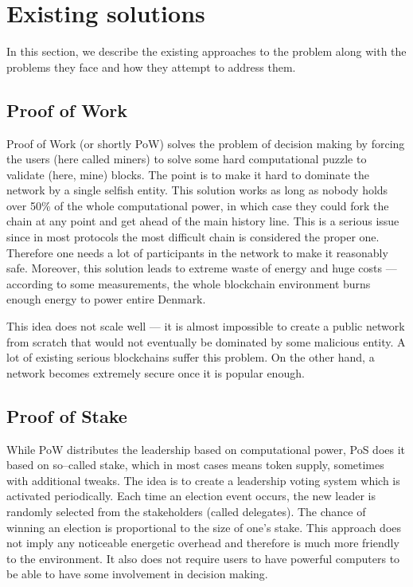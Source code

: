 \section{Existing solutions}

In this section, we describe the existing approaches to the problem along with
the problems they face and how they attempt to address them.

\subsection{Proof of Work}

Proof of Work (or shortly PoW) solves the problem of decision making by forcing
the users (here called miners) to solve some hard computational puzzle to
validate (here, mine) blocks\cite{bitcoin}. The point is to make it hard to
dominate the network by a single selfish entity. This solution works as long as
nobody holds over 50\% of the whole computational power, in which case they
could fork the chain at any point and get ahead of the main history line. This
is a serious issue since in most protocols the most difficult chain is
considered the proper one. Therefore one needs a lot of participants in the
network to make it reasonably safe. Moreover, this solution leads to extreme
waste of energy and huge costs — according to some measurements, the whole
blockchain environment burns enough energy to power entire
Denmark\cite{bitcoin_energy}.

This idea does not scale well — it is almost impossible to create a public
network from scratch that would not eventually be dominated by some malicious
entity. A lot of existing serious blockchains suffer this
problem\cite{51attack}. On the other hand, a network becomes extremely secure
once it is popular enough.

\subsection{Proof of Stake}

While PoW distributes the leadership based on computational power, PoS does it
based on so–called stake, which in most cases means token supply, sometimes with
additional tweaks\cite{peercoin}\cite{cryptocurr_without_pow}. The idea is to
create a leadership voting system which is activated periodically. Each time an
election event occurs, the new leader is randomly selected from the stakeholders
(called delegates). The chance of winning an election is proportional to the
size of one's stake. This approach does not imply any noticeable energetic
overhead and therefore is much more friendly to the environment. It also does
not require users to have powerful computers to be able to have some involvement
in decision making.

